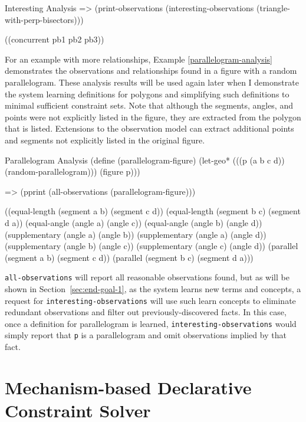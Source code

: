 \begin{repl-example}
[label=interesting-analysis]
{Interesting Analysis}
=> (print-observations (interesting-observations
                         (triangle-with-perp-bisectors)))

((concurrent pb1 pb2 pb3))
\end{repl-example}

For an example with more relationships, Example
\ref{parallelogram-analysis} demonstrates the observations and
relationships found in a figure with a random parallelogram. These
analysis results will be used again later when I demonstrate the
system learning definitions for polygons and simplifying such
definitions to minimal sufficient constraint sets. Note that although
the segments, angles, and points were not explicitly listed in the
figure, they are extracted from the polygon that is listed. Extensions
to the observation model can extract additional points and segments
not explicitly listed in the original figure.

\begin{repl-example}
[label=parallelogram-analysis]
{Parallelogram Analysis}
(define (parallelogram-figure)
  (let-geo* (((p (a b c d)) (random-parallelogram)))
    (figure p)))

=> (pprint (all-observations (parallelogram-figure)))

((equal-length (segment a b) (segment c d))
 (equal-length (segment b c) (segment d a))
 (equal-angle (angle a) (angle c))
 (equal-angle (angle b) (angle d))
 (supplementary (angle a) (angle b))
 (supplementary (angle a) (angle d))
 (supplementary (angle b) (angle c))
 (supplementary (angle c) (angle d))
 (parallel (segment a b) (segment c d))
 (parallel (segment b c) (segment d a)))
\end{repl-example}

\texttt{all-observations} will report all reasonable observations
found, but as will be shown in Section~\ref{sec:end-goal-1}, as the
system learns new terms and concepts, a request for
\texttt{interesting-observations} will use such learn concepts to
eliminate redundant observations and filter out previously-discovered
facts. In this case, once a definition for parallelogram is learned,
\texttt{interesting-observations} would simply report that \texttt{p}
is a parallelogram and omit observations implied by that fact.


\section{Mechanism-based Declarative Constraint Solver}

